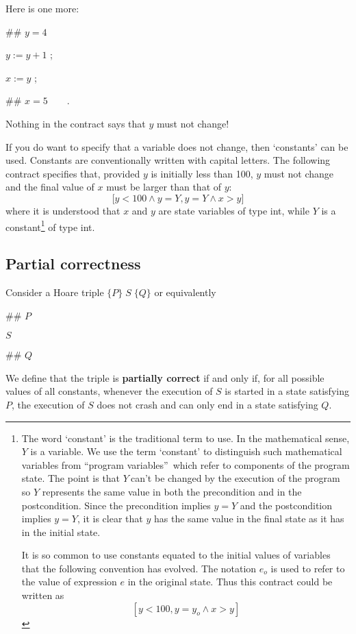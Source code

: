 \documentclass[11pt]{article}%
\begin{document}
\noindent Here is one more:

\begin{code}
\#\# $y=4$

$y:=y+1$ ;

$x:=y$ ;

\#\# $x=5\qquad$.
\end{code}

\noindent Nothing in the contract says that $y$ must not change!

If you do want to specify that a variable does not change, then `constants'
can be used. Constants are conventionally written with capital letters. The
following contract specifies that, provided $y$ is initially less than 100,
$y$ must not change and the final value of $x$ must be larger than that of
$y$:%
\[
\lbrack y<\mathrm{100}\wedge y=Y,y=Y\wedge x>y]
\]
where it is understood that $x$ and $y$ are state variables of type
\textsf{int},\textsf{ }while $Y$ is a constant\footnote{The word `constant' is
the traditional term to use. In the mathematical sense, $Y$ is a variable. We
use the term `constant' to distinguish such mathematical variables from
\textquotedblleft program variables\textquotedblright\ which refer to
components of the program state. The point is that $Y\ $can't be changed by
the execution of the program so $Y$ represents the same value in both the
precondition and in the postcondition. Since the precondition implies $y=Y$
and the postcondition implies $y=Y$, it is clear that $y$ has the same value
in the final state as it has in the initial state.
\par
It is so common to use constants equated to the initial values of variables
that the following convention has evolved. The notation $e_{o}$ is used to
refer to the value of expression $e$ in the original state. Thus this contract
could be written as%
\[
\left[  y<100,y=y_{o}\wedge x>y\right]
\]
} of type \textsf{int}.

\subsection{Partial correctness}

Consider a Hoare triple $\{P\}\;S\;\{Q\}$ or equivalently

\begin{code}
\#\# $P$

$S$

\#\# $Q$
\end{code}

\noindent We define that the triple is \textbf{partially correct} if and only
if, for all possible values of all constants, whenever the execution of $S$ is
started in a state satisfying $P$, the execution of $S$ does not crash and can
only end in a state satisfying $Q$.
\end{document}
